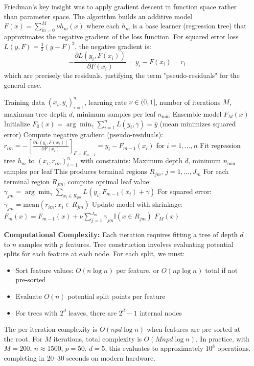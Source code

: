 \documentclass[10pt,twocolumn]{article}
\begin{document}
Friedman's key insight was to apply gradient descent in function space rather than parameter space. The algorithm builds an additive model $F(x) = \sum_{m=0}^M \nu h_m(x)$ where each $h_m$ is a base learner (regression tree) that approximates the negative gradient of the loss function. For squared error loss $L(y, F) = \frac{1}{2}(y - F)^2$, the negative gradient is:
\begin{equation}
-\frac{\partial L(y_i, F(x_i))}{\partial F(x_i)} = y_i - F(x_i) = r_i
\end{equation}
which are precisely the residuals, justifying the term "pseudo-residuals" for the general case.

\begin{algorithm}[H]
\caption{Gradient Boosting for Regression (Least Squares)}
\label{alg:gradboost}
\begin{algorithmic}[1]
\REQUIRE Training data $(x_i, y_i)_{i=1}^n$, learning rate $\nu \in (0,1]$, number of iterations $M$, maximum tree depth $d$, minimum samples per leaf $n_{\min}$
\ENSURE Ensemble model $F_M(x)$
\STATE Initialize $F_0(x) = \arg\min_\gamma \sum_{i=1}^n L(y_i, \gamma) = \bar{y}$ (mean minimizes squared error)
    \STATE Compute negative gradient (pseudo-residuals):
    \STATE \qquad $r_{im} = -\left[\frac{\partial L(y_i, F(x_i))}{\partial F(x_i)}\right]_{F=F_{m-1}} = y_i - F_{m-1}(x_i)$ for $i=1,\ldots,n$
    \STATE Fit regression tree $h_m$ to $(x_i, r_{im})_{i=1}^n$ with constraints:
    \STATE \qquad Maximum depth $d$, minimum $n_{\min}$ samples per leaf
    \STATE \qquad This produces terminal regions $R_{jm}$, $j=1,\ldots,J_m$
    \STATE For each terminal region $R_{jm}$, compute optimal leaf value:
    \STATE \qquad $\gamma_{jm} = \arg\min_\gamma \sum_{x_i \in R_{jm}} L(y_i, F_{m-1}(x_i) + \gamma)$
    \STATE \qquad For squared error: $\gamma_{jm} = \text{mean}(r_{im} : x_i \in R_{jm})$
    \STATE Update model with shrinkage:
    \STATE \qquad $F_m(x) = F_{m-1}(x) + \nu \sum_{j=1}^{J_m} \gamma_{jm} \mathbb{I}(x \in R_{jm})$
\ENDFOR
\RETURN $F_M(x)$
\end{algorithmic}
\end{algorithm}

\textbf{Computational Complexity:} Each iteration requires fitting a tree of depth $d$ to $n$ samples with $p$ features. Tree construction involves evaluating potential splits for each feature at each node. For each split, we must:
\begin{itemize}
\setlength{\itemsep}{0pt}
\item Sort feature values: $O(n \log n)$ per feature, or $O(np \log n)$ total if not pre-sorted
\item Evaluate $O(n)$ potential split points per feature
\item For trees with $2^d$ leaves, there are $2^d - 1$ internal nodes
\end{itemize}
The per-iteration complexity is $O(np d \log n)$ when features are pre-sorted at the root. For $M$ iterations, total complexity is $O(Mnpd\log n)$. In practice, with $M=200$, $n \approx 1500$, $p=50$, $d=5$, this evaluates to approximately $10^8$ operations, completing in 20--30 seconds on modern hardware.
\end{document}

